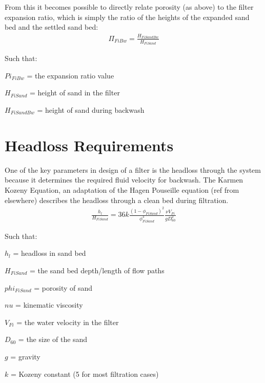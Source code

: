 \documentclass[letterpaper,10pt,english]{sphinxmanual}
\begin{document}
From this it becomes possible to directly relate porosity (as above) to the filter expansion ratio, which is simply the ratio of the heights of the expanded sand bed and the settled sand bed:
\begin{equation}\label{equation:Filtration/Filtration_Design:filter_expansion_ratio}
\begin{split}\Pi_{FiBw} = \frac{H_{FiSandBw}}{H_{FiSand}}\end{split}
\end{equation}
\begin{DUlineblock}{0em}
\item[] Such that:
\item[] \(Pi_{FiBw}\) = the expansion ratio value
\item[] \(H_{FiSand}\) = height of sand in the filter
\item[] \(H_{FiSandBw}\) = height of sand during backwash
\end{DUlineblock}


\section{Headloss Requirements}
\label{\detokenize{Filtration/Filtration_Design:headloss-requirements}}\label{\detokenize{Filtration/Filtration_Design:heading-headloss-requirements}}
One of the key parameters in design of a filter is the headloss through the system because it determines the required fluid velocity for backwash. The Karmen Kozeny Equation, an adaptation of the Hagen Pouseille equation (ref from elsewhere) describes the headloss through a clean bed during filtration.
\begin{equation}\label{equation:Filtration/Filtration_Design:karmen_kozeny_clean_bed}
\begin{split}  \frac{h_l}{H_{FiSand}} = 36 k \frac{\left( 1 - \phi_{FiSand} \right)^2}{\phi_{FiSand}^3} \frac{\nu V_{Fi}}{g D_{60}^2}\end{split}
\end{equation}
\begin{DUlineblock}{0em}
\item[] Such that:
\item[] \(h_l\) = headloss in sand bed
\item[] \(H_{FiSand}\) = the sand bed depth/length of flow paths
\item[] \(phi_{FiSand}\) = porosity of sand
\item[] \(nu\) = kinematic viscosity
\item[] \(V_{Fi}\) = the water velocity in the filter
\item[] \(D_{60}\) = the size of the sand
\item[] \(g\) = gravity
\item[] \(k\) = Kozeny constant (5 for most filtration cases)
\end{DUlineblock}
\end{document}
